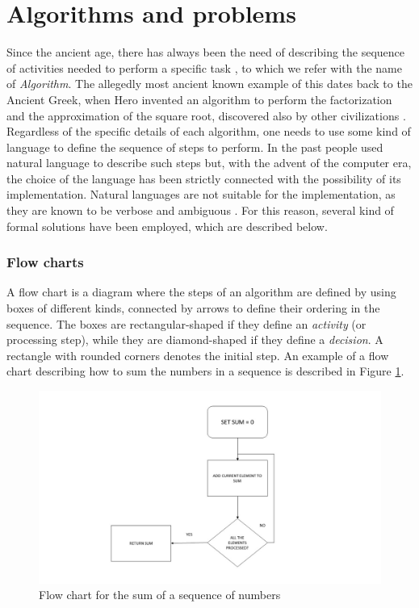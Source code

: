 \section{Algorithms and problems}
\label{sec:ch1_algorithms}
Since the ancient age, there has always been the need of describing the sequence of activities needed to perform a specific task \cite{barbin2012history}, to which we refer with the name of \textit{Algorithm}. The allegedly most ancient known example of this dates back to the Ancient Greek, when Hero invented an algorithm to perform the factorization and the approximation of the square root, discovered also by other civilizations \cite{ bailey2012ancient, smith1923history} . Regardless of the specific details of each algorithm, one needs to use some kind of language  to define the sequence of steps to perform. In the past people used natural language to describe such steps but, with the advent of the computer era, the choice of the language has been strictly connected with the possibility of its implementation. Natural languages are not suitable for the implementation, as they are known to be verbose and ambiguous \cite{church1982coping, resnik1999semantic}. For this reason, several kind of formal solutions have been employed, which are described below.

\subsubsection*{Flow charts}
A flow chart is a diagram where the steps of an algorithm are defined by using boxes of different kinds, connected by arrows to define their ordering in the sequence. The boxes are rectangular-shaped if they define an \textit{activity} (or processing step), while they are diamond-shaped if they define a \textit{decision}. A rectangle with rounded corners denotes the initial step. An example of a flow chart describing how to sum the numbers in a sequence is described in Figure \ref{fig:ch1_flow_chart}.

\begin{figure}
	\centering
	\includegraphics[width = \textwidth]{Figures/flow_chart}
	\caption{Flow chart for the sum of a sequence of numbers}
	\label{fig:ch1_flow_chart}
\end{figure}

